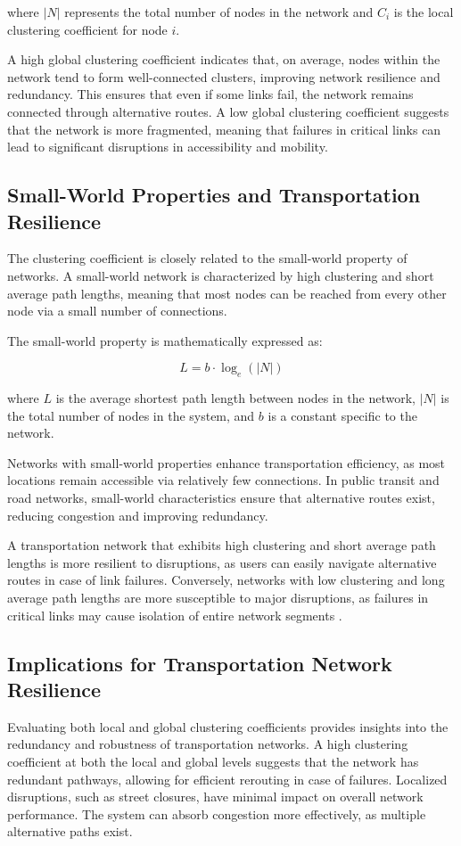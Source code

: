 where \( |N| \) represents the total number of nodes in the network and \( C_i \) is the local clustering coefficient for node \( i \).

A high global clustering coefficient indicates that, on average, nodes within the network tend to form well-connected clusters, improving network resilience and redundancy. This ensures that even if some links fail, the network remains connected through alternative routes. A low global clustering coefficient suggests that the network is more fragmented, meaning that failures in critical links can lead to significant disruptions in accessibility and mobility.
\subsection{Small-World Properties and Transportation Resilience}
The clustering coefficient is closely related to the small-world property of networks. A small-world network is characterized by high clustering and short average path lengths, meaning that most nodes can be reached from every other node via a small number of connections.

The small-world property is mathematically expressed as:

\begin{equation}
L = b \cdot \log_e(|N|)
\end{equation}

where \( L \) is the average shortest path length between nodes in the network, \( |N| \) is the total number of nodes in the system, and \( b \) is a constant specific to the network.

Networks with small-world properties enhance transportation efficiency, as most locations remain accessible via relatively few connections. In public transit and road networks, small-world characteristics ensure that alternative routes exist, reducing congestion and improving redundancy.

A transportation network that exhibits high clustering and short average path lengths is more resilient to disruptions, as users can easily navigate alternative routes in case of link failures. Conversely, networks with low clustering and long average path lengths are more susceptible to major disruptions, as failures in critical links may cause isolation of entire network segments \cite{taylor2017}.

\subsection{Implications for Transportation Network Resilience}
Evaluating both local and global clustering coefficients provides insights into the redundancy and robustness of transportation networks. A high clustering coefficient at both the local and global levels suggests that the network has redundant pathways, allowing for efficient rerouting in case of failures. Localized disruptions, such as street closures, have minimal impact on overall network performance. The system can absorb congestion more effectively, as multiple alternative paths exist.

